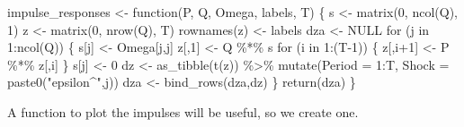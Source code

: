 \documentclass[
  letterpaper,
]{book}
\newenvironment{Shaded}{\begin{snugshade}}{\end{snugshade}}
\newcommand{\AttributeTok}[1]{\textcolor[rgb]{0.40,0.45,0.13}{#1}}
\newcommand{\ConstantTok}[1]{\textcolor[rgb]{0.56,0.35,0.01}{#1}}
\newcommand{\ControlFlowTok}[1]{\textcolor[rgb]{0.00,0.23,0.31}{#1}}
\newcommand{\DecValTok}[1]{\textcolor[rgb]{0.68,0.00,0.00}{#1}}
\newcommand{\FunctionTok}[1]{\textcolor[rgb]{0.28,0.35,0.67}{#1}}
\newcommand{\NormalTok}[1]{\textcolor[rgb]{0.00,0.23,0.31}{#1}}
\newcommand{\OtherTok}[1]{\textcolor[rgb]{0.00,0.23,0.31}{#1}}
\newcommand{\SpecialCharTok}[1]{\textcolor[rgb]{0.37,0.37,0.37}{#1}}
\newcommand{\StringTok}[1]{\textcolor[rgb]{0.13,0.47,0.30}{#1}}
\begin{document}
\begin{Shaded}
\begin{Highlighting}[]
\NormalTok{impulse\_responses }\OtherTok{\textless{}{-}} \ControlFlowTok{function}\NormalTok{(P, Q, Omega, labels, T) \{}
\NormalTok{  s   }\OtherTok{\textless{}{-}} \FunctionTok{matrix}\NormalTok{(}\DecValTok{0}\NormalTok{, }\FunctionTok{ncol}\NormalTok{(Q), }\DecValTok{1}\NormalTok{)}
\NormalTok{  z   }\OtherTok{\textless{}{-}} \FunctionTok{matrix}\NormalTok{(}\DecValTok{0}\NormalTok{, }\FunctionTok{nrow}\NormalTok{(Q), T)}
  \FunctionTok{rownames}\NormalTok{(z) }\OtherTok{\textless{}{-}}\NormalTok{ labels}
\NormalTok{  dza }\OtherTok{\textless{}{-}} \ConstantTok{NULL}
  \ControlFlowTok{for}\NormalTok{ (j }\ControlFlowTok{in} \DecValTok{1}\SpecialCharTok{:}\FunctionTok{ncol}\NormalTok{(Q)) \{}
\NormalTok{    s[j]  }\OtherTok{\textless{}{-}}\NormalTok{ Omega[j,j]}
\NormalTok{    z[,}\DecValTok{1}\NormalTok{] }\OtherTok{\textless{}{-}}\NormalTok{ Q }\SpecialCharTok{\%*\%}\NormalTok{ s}
    \ControlFlowTok{for}\NormalTok{ (i }\ControlFlowTok{in} \DecValTok{1}\SpecialCharTok{:}\NormalTok{(T}\DecValTok{{-}1}\NormalTok{)) \{}
\NormalTok{      z[,i}\SpecialCharTok{+}\DecValTok{1}\NormalTok{] }\OtherTok{\textless{}{-}}\NormalTok{ P }\SpecialCharTok{\%*\%}\NormalTok{ z[,i]}
\NormalTok{    \}}
\NormalTok{    s[j] }\OtherTok{\textless{}{-}} \DecValTok{0}
\NormalTok{    dz }\OtherTok{\textless{}{-}} \FunctionTok{as\_tibble}\NormalTok{(}\FunctionTok{t}\NormalTok{(z)) }\SpecialCharTok{\%\textgreater{}\%} 
      \FunctionTok{mutate}\NormalTok{(}\AttributeTok{Period =} \DecValTok{1}\SpecialCharTok{:}\NormalTok{T, }\AttributeTok{Shock =} \FunctionTok{paste0}\NormalTok{(}\StringTok{"epsilon\^{}"}\NormalTok{,j))}
\NormalTok{    dza }\OtherTok{\textless{}{-}} \FunctionTok{bind\_rows}\NormalTok{(dza,dz)}
\NormalTok{  \}}
  \FunctionTok{return}\NormalTok{(dza)}
\NormalTok{\}}
\end{Highlighting}
\end{Shaded}

A function to plot the impulses will be useful, so we create one.
\end{document}
